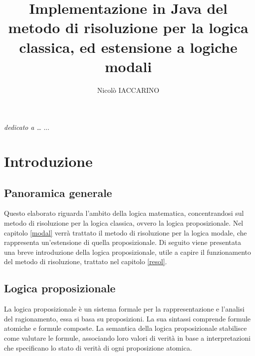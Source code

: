 \documentclass[a4paper,12pt]{report}
\begin{document}
\title{Implementazione in Java del metodo di risoluzione per la logica classica, ed estensione a logiche modali}
\author{Nicolò IACCARINO}
% 
%
\beforepreface
{}
        {\hfill \Large {\sl dedicato a \dots}}
% 
%
...

%
%

\afterpreface
\pagestyle{mystyle} %
% 
% 
\chapter{Introduzione}
\label{intro}

\section{Panoramica generale}
Questo elaborato riguarda l'ambito della logica matematica, concentrandosi sul metodo di risoluzione per la logica classica, ovvero la logica proposizionale. Nel capitolo \ref{modal} verrà trattato il metodo di risoluzione per la logica modale, che rappresenta un'estensione di quella proposizionale. Di seguito viene presentata una breve introduzione della logica proposizionale, utile a capire il funzionamento del metodo di risoluzione, trattato nel capitolo \ref{resol}.

\section{Logica proposizionale}

La logica proposizionale è un sistema formale per la rappresentazione e l'analisi del ragionamento, essa si basa su proposizioni. La sua sintassi comprende formule atomiche e formule composte. La semantica della logica proposizionale stabilisce come valutare le formule, associando loro valori di verità in base a interpretazioni che specificano lo stato di verità di ogni proposizione atomica.
\end{document}
